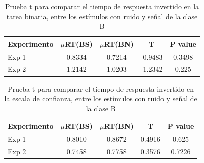 \begin{table}
\caption[Prueba t para comparar el tiempo de respuesta invertido en la tarea binaria, entre los estímulos con ruido y señal de la clase B]{Prueba t para comparar el tiempo de respuesta invertido en la tarea binaria, entre los estímulos con ruido y señal de la clase B}
\label{Tabla_RT1_B}
\centering
\begin{tabular}{l |  c c c c}
\toprule
\textbf{Experimento} & \textbf{$\mu$RT(BS)} & \textbf{$\mu$RT(BN)} & \textbf{T} & \textbf{P value}\\
\midrule
Exp 1 & 0.8334 & 0.7214 & -0.9483 & 0.3498 \\
Exp 2 & 1.2142 & 1.0203 & -1.2342 & 0.225  \\
\bottomrule
\end{tabular}
\end{table}

\begin{table}
\caption[Prueba t para comparar el tiempo de respuesta invertido en la escala de confianza, entre los estímulos con ruido y señal de la clase B]{Prueba t para comparar el tiempo de respuesta invertido en la escala de confianza, entre los estímulos con ruido y señal de la clase B}
\label{Tabla_RT2_B}
\centering
\begin{tabular}{l |  c c c c}
\toprule
\textbf{Experimento} & \textbf{$\mu$RT(BS)} & \textbf{$\mu$RT(BN)} & \textbf{T} & \textbf{P value}\\
\midrule
Exp 1 & 0.8010 & 0.8672 & 0.4916 & 0.625 \\
Exp 2 & 0.7458 & 0.7758 & 0.3576 & 0.7226  \\
\bottomrule
\end{tabular}
\end{table}
